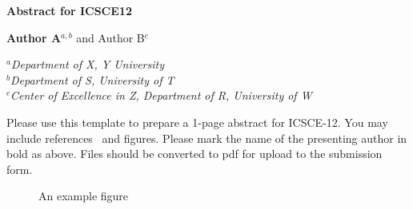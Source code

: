 \documentclass[10pt,a4paper]{article}
\date{}
\newcommand{\AbstractTitle}[1]{
\begin{center}
{\Large \textbf{#1}}
\end{center}
\vspace{-2.5ex}
}
\newcommand{\AuthorList}[1]{
\begin{center}
{\normalsize #1}
\end{center}
\vspace{-4ex}
}
\newcommand{\Address}[1]{
\begin{center}
{\small \textit{#1}}
\end{center}
}
\begin{document}
\thispagestyle{fancy}

\AbstractTitle{Abstract for ICSCE12} %
\AuthorList{\textbf{Author A}$^{a,b}$ and Author B$^{c}$} %
\Address{$^a$Department of X, Y University\\$^b$Department of S, University of T\\$^c$Center of Excellence in Z, Department of R, University of W} %
Please use this template to prepare a 1-page abstract for ICSCE-12. You may include references~\cite{abbarchi_macroscopic_2013} and figures. Please mark the name of the presenting author in bold as above. Files should be converted to pdf for upload to the submission form.

\begin{figure}[h]
    \centering
    \caption{An example figure}
    \label{figpaperID}
\end{figure}



\end{document}
